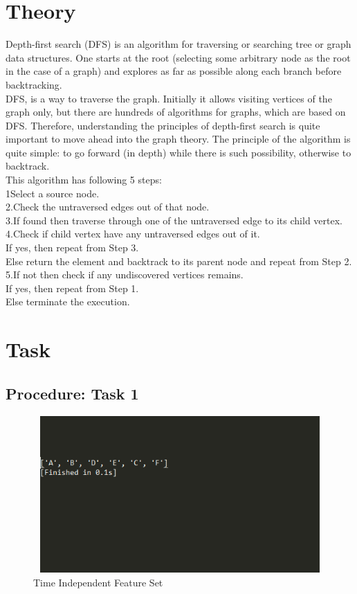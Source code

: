 \documentclass[11pt]{article}            %
\begin{document}
\section{Theory }              
 Depth-first search (DFS) is an algorithm for traversing or searching tree or graph data structures. One starts at the root (selecting some arbitrary node as the root in the case of a graph) and explores as far as possible along each branch before backtracking.\\
DFS, is a way to traverse the graph. Initially it allows visiting vertices of the graph only, but there are hundreds of algorithms for graphs, which are based on DFS. Therefore, understanding the principles of depth-first search is quite important to move ahead into the graph theory. The principle of the algorithm is quite simple: to go forward (in depth) while there is such possibility, otherwise to backtrack.\\	
This algorithm has following 5 steps: \\
1Select a source node. \\
2.Check the untraversed edges out of that node.\\
3.If found then traverse through one of the untraversed edge to its child vertex.\\
4.Check if child vertex have any untraversed edges out of it.\\
If yes, then repeat from Step 3.\\
Else return the element and backtrack to its parent node and repeat from Step 2.\\
5.If not then check if any undiscovered vertices remains.\\
If yes, then repeat from Step 1.\\
Else terminate the execution.\\
\section{Task}  
\subsection{Procedure: Task 1 }     

\begin{figure}
\centering
  \includegraphics[width=12cm,height=6cm,keepaspectratio]{1.png}
\caption{Time Independent Feature Set}
\label{Figure:3}    
\end{figure}
\end{document}
